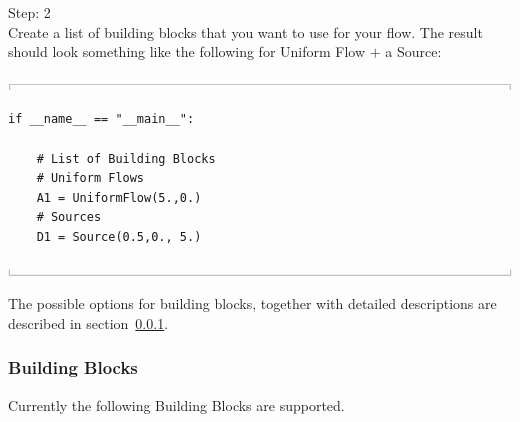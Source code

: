 \documentclass[10pt,a4paper]{article}
\newcommand{\topbar}{\ensuremath{
    \rule{0.1mm}{2.0mm} \rule[2.0mm]{159.5mm}{0.1mm} \rule{0.1mm}{2.0mm}
}}
\newcommand{\bottombar}{\ensuremath{
    \rule{0.1mm}{2.0mm} \rule{159.5mm}{0.1mm} \rule{0.1mm}{2.0mm}
}}
\begin{document}
\noindent
{\huge Step: 2}\\
Create a list of building blocks that you want to use for your flow. 
The result should look something like the following for Uniform Flow $+$ a Source:
 
\noindent
\topbar
\begin{lstlisting}
if __name__ == "__main__":

    # List of Building Blocks 
    # Uniform Flows  
    A1 = UniformFlow(5.,0.)
    # Sources
    D1 = Source(0.5,0., 5.)
\end{lstlisting}
\bottombar

The possible options for building blocks, together with detailed descriptions are described in section~\ref{S_building_blocks}.


\subsubsection{Building Blocks}\label{S_building_blocks}
Currently the following Building Blocks are supported.
\end{document}
